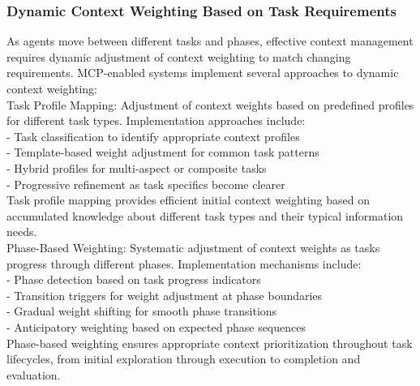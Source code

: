 \subsubsection{Dynamic Context Weighting Based on Task Requirements}
As agents move between different tasks and phases, effective context management requires dynamic adjustment of context weighting to match changing requirements. MCP-enabled systems implement several approaches to dynamic context weighting:\\ \newline
Task Profile Mapping: Adjustment of context weights based on predefined profiles for different task types. Implementation approaches include:\\ \newline
- Task classification to identify appropriate context profiles\\ \newline
- Template-based weight adjustment for common task patterns\\ \newline
- Hybrid profiles for multi-aspect or composite tasks\\ \newline
- Progressive refinement as task specifics become clearer\\ \newline
Task profile mapping provides efficient initial context weighting based on accumulated knowledge about different task types and their typical information needs.\\ \newline
Phase-Based Weighting: Systematic adjustment of context weights as tasks progress through different phases. Implementation mechanisms include:\\ \newline
- Phase detection based on task progress indicators\\ \newline
- Transition triggers for weight adjustment at phase boundaries\\ \newline
- Gradual weight shifting for smooth phase transitions\\ \newline
- Anticipatory weighting based on expected phase sequences\\ \newline
Phase-based weighting ensures appropriate context prioritization throughout task lifecycles, from initial exploration through execution to completion and evaluation.\\ \newline
